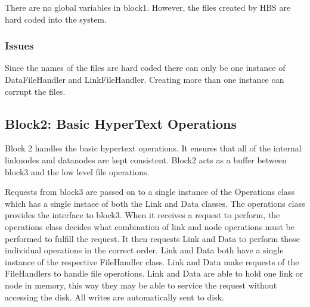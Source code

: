 There are no global variables in block1.  However, the files created by HBS
are hard coded into the system. 

\subsubsection*{Issues}
\label{sec:block1Issues}

Since the names of the files are hard coded there can only be one instance
of DataFileHandler and LinkFileHandler.  Creating more than one instance
can corrupt the files.  

\subsection{Block2: Basic HyperText Operations}

Block 2 handles the basic hypertext operations.  It ensures that all of the
internal linknodes and datanodes are kept consistent.  Block2 acts as a
buffer between block3 and the low level file operations.  

Requests from block3 are passed on to a single instance of the Operations
class which has a single instace of both the Link and Data classes.  The
operations class provides the interface to block3.  When it receives a
request to perform, the operations class decides what combination of link
and node operations must be performed to fulfill the request.  It then
requests Link and Data to perform those individual operations in the
correct order.  Link and Data both have a single instance of the respective
FileHandler class.  Link and Data make requests of the FileHandlers to
handle file operations.  Link and Data are able to hold one link or node in
memory, this way they may be able to service the request without accessing
the disk.  All writes are automatically sent to disk.

